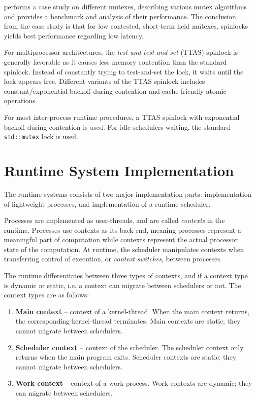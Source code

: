  performs a case study on different mutexes, describing various mutex algorithms and provides a benchmark and analysis of their performance. The conclusion from the case study is that for low contested, short\hyp{}term held mutexes, spinlocks yields best performance regarding low latency. 

For multiprocessor architectures, the \textit{test\hyp{}and\hyp{}test\hyp{}and\hyp{}set} (TTAS) spinlock is generally favorable as it causes less memory contention than the standard spinlock. Instead of constantly trying to test\hyp{}and\hyp{}set the lock, it waits until the lock appears free. Different variants of the TTAS spinlock includes constant/exponential backoff during contention and cache friendly atomic operations.

For most inter\hyp{}process runtime procedures, a TTAS spinlock with exponential backoff during contention is used. For idle schedulers waiting, the standard \lstinline[style={CustomC++}]|std::mutex| lock is used.


\section{Runtime System Implementation}
\label{sec:runtime_system_implementation}


The runtime systems consists of two major implementation parts: implementation of lightweight processes, and implementation of a runtime scheduler.

Processes are implemented as user\hyp{}threads, and are called \textit{contexts} in the runtime. Processes use contexts as its back end, meaning processes represent a meaningful part of computation while contexts represent the actual processor state of the computation. At runtime, the scheduler manipulates contexts when transferring control of execution, or \textit{context switches}, between processes. 

The runtime differentiates between three types of contexts, and if a context type is dynamic or static, i.e. a context can migrate between schedulers or not. The context types are as follows:

\begin{enumerate}[topsep=0em,itemsep=-1em,partopsep=0.5em,parsep=1em]
    \item \textbf{Main context} -- context of a kernel\hyp{}thread. When the main context returns, the corresponding kernel\hyp{}thread terminates. Main contexts are static; they cannot migrate between schedulers.
    \item \textbf{Scheduler context} -- context of the scheduler. The scheduler context only returns when the main program exits. Scheduler contexts are static; they cannot migrate between schedulers.
    \item \textbf{Work context} -- context of a work process. Work contexts are dynamic; they can migrate between schedulers.
\end{enumerate}


